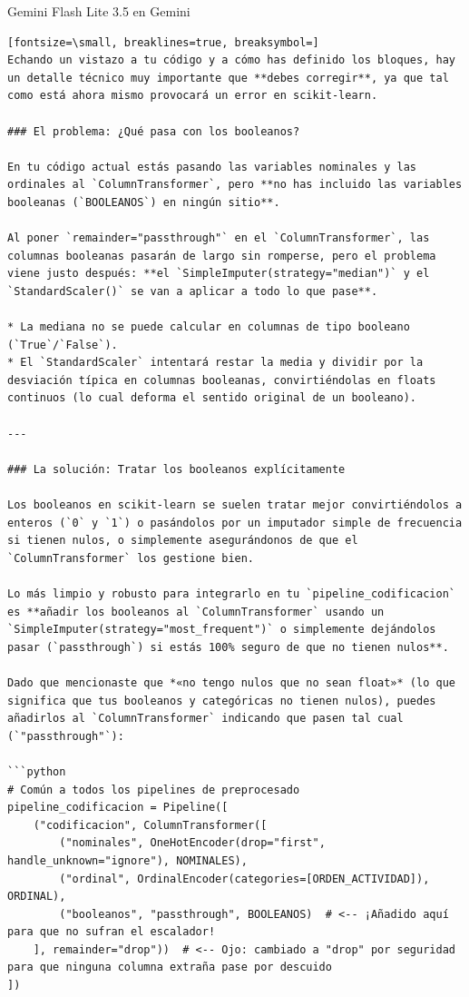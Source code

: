\documentclass[12pt,a4paper,oneside]{book}
\begin{document}
\begin{iaresp}{Gemini Flash Lite 3.5 en Gemini}
\begin{Verbatim}[fontsize=\small, breaklines=true, breaksymbol=]
Echando un vistazo a tu código y a cómo has definido los bloques, hay un detalle técnico muy importante que **debes corregir**, ya que tal como está ahora mismo provocará un error en scikit-learn.

### El problema: ¿Qué pasa con los booleanos?

En tu código actual estás pasando las variables nominales y las ordinales al `ColumnTransformer`, pero **no has incluido las variables booleanas (`BOOLEANOS`) en ningún sitio**.

Al poner `remainder="passthrough"` en el `ColumnTransformer`, las columnas booleanas pasarán de largo sin romperse, pero el problema viene justo después: **el `SimpleImputer(strategy="median")` y el `StandardScaler()` se van a aplicar a todo lo que pase**.

* La mediana no se puede calcular en columnas de tipo booleano (`True`/`False`).
* El `StandardScaler` intentará restar la media y dividir por la desviación típica en columnas booleanas, convirtiéndolas en floats continuos (lo cual deforma el sentido original de un booleano).

---

### La solución: Tratar los booleanos explícitamente

Los booleanos en scikit-learn se suelen tratar mejor convirtiéndolos a enteros (`0` y `1`) o pasándolos por un imputador simple de frecuencia si tienen nulos, o simplemente asegurándonos de que el `ColumnTransformer` los gestione bien.

Lo más limpio y robusto para integrarlo en tu `pipeline_codificacion` es **añadir los booleanos al `ColumnTransformer` usando un `SimpleImputer(strategy="most_frequent")` o simplemente dejándolos pasar (`passthrough`) si estás 100% seguro de que no tienen nulos**.

Dado que mencionaste que *«no tengo nulos que no sean float»* (lo que significa que tus booleanos y categóricas no tienen nulos), puedes añadirlos al `ColumnTransformer` indicando que pasen tal cual (`"passthrough"`):

```python
# Común a todos los pipelines de preprocesado
pipeline_codificacion = Pipeline([
    ("codificacion", ColumnTransformer([
        ("nominales", OneHotEncoder(drop="first", handle_unknown="ignore"), NOMINALES),
        ("ordinal", OrdinalEncoder(categories=[ORDEN_ACTIVIDAD]), ORDINAL),
        ("booleanos", "passthrough", BOOLEANOS)  # <-- ¡Añadido aquí para que no sufran el escalador!
    ], remainder="drop"))  # <-- Ojo: cambiado a "drop" por seguridad para que ninguna columna extraña pase por descuido
])


\end{Verbatim}
\end{iaresp}
\end{document}

